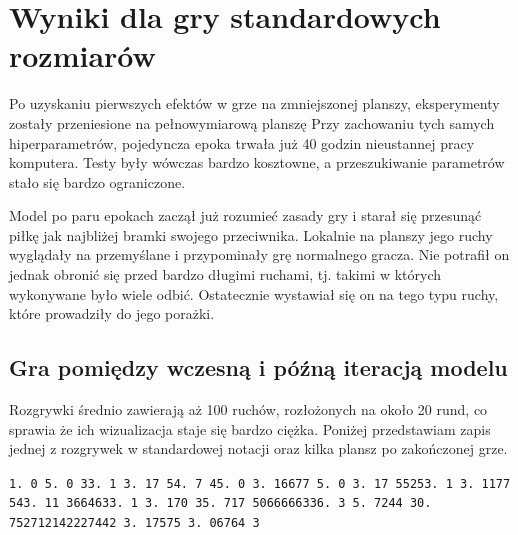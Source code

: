 \documentclass[licencjacka]{pracamgr}
\begin{document}
\section{Wyniki dla gry standardowych rozmiarów}

Po uzyskaniu pierwszych efektów w grze na zmniejszonej planszy, eksperymenty zostały przeniesione na pełnowymiarową planszę Przy zachowaniu tych samych hiperparametrów, pojedyncza epoka trwała już 40 godzin nieustannej pracy komputera. Testy były wówczas bardzo kosztowne, a przeszukiwanie parametrów stało się bardzo ograniczone. 

Model po paru epokach zaczął już rozumieć zasady gry i starał się przesunąć piłkę jak najbliżej bramki swojego przeciwnika. Lokalnie na planszy jego ruchy wyglądały na przemyślane i przypominały grę normalnego gracza. Nie potrafił on jednak obronić się przed bardzo długimi ruchami, tj. takimi w których wykonywane było wiele odbić. Ostatecznie wystawiał się on na tego typu ruchy, które prowadziły do jego porażki.


\subsection{Gra pomiędzy wczesną i późną iteracją modelu}

Rozgrywki średnio zawierają aż 100 ruchów, rozłożonych na około 20 rund, co sprawia że ich wizualizacja staje się bardzo ciężka. Poniżej przedstawiam zapis jednej z rozgrywek w standardowej notacji oraz kilka plansz po zakończonej grze.

\texttt{1.\,0 5.\,0 33.\,1 3.\,17 54.\,7 45.\,0 3.\,16677 5.\,0 3.\,17 55253.\,1 3.\,1177 543.\,11 3664633.\,1 3.\,170 35.\,717 5066666336.\,3 5.\,7244 30.\,752712142227442 3.\,17575 3.\,06764 3\;
}
\end{document}
